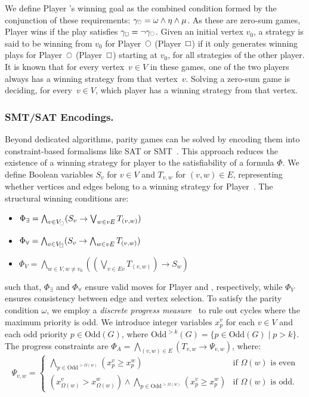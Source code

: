 \documentclass[runningheads]{llncs}
\begin{document}
We define Player \even's winning goal as the combined condition formed by the conjunction of these requirements:
$\gamma_{\subeven} = \omega \wedge \eta \wedge \mu$. As these are zero-sum games, Player \odd wins if the play satisfies $\gamma_{\subodd} = \neg \gamma_{\subeven}$.
%
Given an initial vertex $v_0$, a strategy is said to be winning from $v_0$ for Player~$\even$ (Player~$\odd$) if it only generates winning plays for Player~$\even$ (Player~$\odd$) starting at $v_0$, for all strategies of the other player. It is known that for every vertex~$v\in V$ in these games, one of the two players always has a winning strategy from that vertex~$v$. Solving a zero-sum game is deciding, for every~$v\in V$, which player has a winning strategy from that vertex.

\subsubsection{SMT/SAT Encodings.}\label{sec:satencoding}

Beyond dedicated algorithms, parity games can be solved by encoding them into constraint-based formalisms like SAT or SMT~\cite{Heljanko:2012}. This approach reduces the existence of a winning strategy for player \even to the satisfiability of a formula $\Phi$. We define Boolean variables $S_v$ for $v \in V$ and $T_{v,w}$ for $(v, w) \in E$, representing whether vertices and edges belong to a winning strategy for Player~\even. The structural winning conditions are:

\begin{itemize}[itemsep=1.0ex, parsep=0pt]
    \item $\Phi_\exists = \bigwedge_{v \in V_{\subeven}} (S_v \rightarrow \bigvee_{w \in vE} T_{(v,w)})$ 
    \item $\Phi_\forall = \bigwedge_{v \in V_{\subodd}} (S_v \rightarrow \bigwedge_{w \in vE} T_{(v,w)})$
    \item $\Phi_V = \bigwedge_{w \in V, w \neq v_0} \left( \left(\bigvee_{v \in Ev} T_{(v,w)}\right) \rightarrow S_w \right)$
\end{itemize}
such that, 
$\Phi_\exists$ and $\Phi_\forall$ ensure valid moves for Player \even and \odd, respectively, while $\Phi_V$ ensures consistency between edge and vertex selection. To satisfy the parity condition $\omega$, we employ a \textit{discrete progress measure}~\cite{Jurdziński:2000} to rule out cycles where the maximum priority is odd. We introduce integer variables $x_p^v$ for each $v \in V$ and each odd priority $p \in \text{Odd}(G)$, where $\text{Odd}^{>k}(G) = \{p \in \text{Odd}(G) \mid p > k\}$. The progress constraints are $\Phi_A = \bigwedge_{(v,w) \in E} (T_{v,w} \to \Psi_{v,w})$, where:
%
\[
\Psi_{v,w} = 
\begin{cases} 
\bigwedge_{p \in \text{Odd}^{>\Omega(w)}} (x_p^v \geq x_p^w) & \text{if } \Omega(w) \text{ is even} \\
(x_{\Omega(w)}^v > x_{\Omega(w)}^w) \land \bigwedge_{p \in \text{Odd}^{>\Omega(w)}} (x_p^v \geq x_p^w) & \text{if } \Omega(w) \text{ is odd}.
\end{cases}
\]
\end{document}
